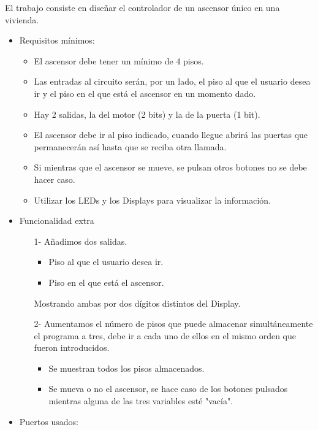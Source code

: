    El trabajo consiste en diseñar el controlador de un ascensor único en una vivienda.
    \begin{itemize}
        \item Requisitos mínimos:
        \begin{itemize}
    		    \item El ascensor debe tener un mínimo de 4 pisos.
    		    \item Las entradas al circuito serán, por un lado, el piso al que el usuario desea ir y el piso en el que está el ascensor en un momento dado.
    		    \item Hay 2 salidas, la del motor (2 bits) y la de la puerta (1 bit).
    		    \item El ascensor debe ir al piso indicado, cuando llegue abrirá las puertas que permanecerán así hasta que se reciba otra llamada.
    		    \item Si mientras que el ascensor se mueve, se pulsan otros botones no se debe hacer caso.
    		    \item Utilizar los LEDs y los Displays para visualizar la información.
    	\end{itemize}
        \item Funcionalidad extra
        \begin{itemize}
            \item [1-] Añadimos dos salidas. 
            \begin{itemize}
        		    \item Piso al que el usuario desea ir.
                \item Piso en el que está el ascensor.
            \end{itemize}  
            Mostrando ambas por dos dígitos distintos del Display.
            \item [2-] Aumentamos el número de pisos que puede almacenar simultáneamente el programa a tres, debe ir a cada uno de ellos en el mismo orden que fueron introducidos.
            \begin{itemize}
        		    \item Se muestran todos los pisos almacenados.
      	  	    \item Se mueva o no el ascensor, se hace caso de los botones pulsados mientras alguna de las tres variables esté "vacía".
    	    \end{itemize}
	    \end{itemize}
        \item Puertos usados:
        \begin{itemize}

\end{itemize}
\end{itemize}

